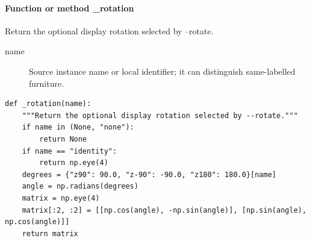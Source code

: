 \documentclass[11pt,a4paper]{book}
\begin{document}
\paragraph{Function or method \_rotation}
Return the optional display rotation selected by --rotate.

\begin{description}
\item[name] Source instance name or local identifier; it can distinguish same-labelled furniture.
\end{description}

\begin{lstlisting}[firstnumber=39]
def _rotation(name):
    """Return the optional display rotation selected by --rotate."""
    if name in (None, "none"):
        return None
    if name == "identity":
        return np.eye(4)
    degrees = {"z90": 90.0, "z-90": -90.0, "z180": 180.0}[name]
    angle = np.radians(degrees)
    matrix = np.eye(4)
    matrix[:2, :2] = [[np.cos(angle), -np.sin(angle)], [np.sin(angle), np.cos(angle)]]
    return matrix


\end{lstlisting}
\end{document}
